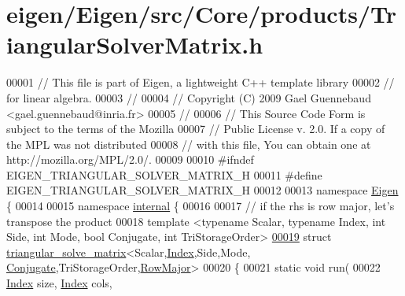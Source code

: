 \hypertarget{eigen_2_eigen_2src_2_core_2products_2_triangular_solver_matrix_8h_source}{}\section{eigen/\+Eigen/src/\+Core/products/\+Triangular\+Solver\+Matrix.h}
\label{eigen_2_eigen_2src_2_core_2products_2_triangular_solver_matrix_8h_source}

\begin{DoxyCode}
00001 \textcolor{comment}{// This file is part of Eigen, a lightweight C++ template library}
00002 \textcolor{comment}{// for linear algebra.}
00003 \textcolor{comment}{//}
00004 \textcolor{comment}{// Copyright (C) 2009 Gael Guennebaud <gael.guennebaud@inria.fr>}
00005 \textcolor{comment}{//}
00006 \textcolor{comment}{// This Source Code Form is subject to the terms of the Mozilla}
00007 \textcolor{comment}{// Public License v. 2.0. If a copy of the MPL was not distributed}
00008 \textcolor{comment}{// with this file, You can obtain one at http://mozilla.org/MPL/2.0/.}
00009 
00010 \textcolor{preprocessor}{#ifndef EIGEN\_TRIANGULAR\_SOLVER\_MATRIX\_H}
00011 \textcolor{preprocessor}{#define EIGEN\_TRIANGULAR\_SOLVER\_MATRIX\_H}
00012 
00013 \textcolor{keyword}{namespace }\hyperlink{namespace_eigen}{Eigen} \{ 
00014 
00015 \textcolor{keyword}{namespace }\hyperlink{namespaceinternal}{internal} \{
00016 
00017 \textcolor{comment}{// if the rhs is row major, let's transpose the product}
00018 \textcolor{keyword}{template} <\textcolor{keyword}{typename} Scalar, \textcolor{keyword}{typename} Index, \textcolor{keywordtype}{int} S\textcolor{keywordtype}{id}e, \textcolor{keywordtype}{int} Mode, \textcolor{keywordtype}{bool} Conjugate, \textcolor{keywordtype}{int} TriStorageOrder>
\hyperlink{struct_eigen_1_1internal_1_1triangular__solve__matrix_3_01_scalar_00_01_index_00_01_side_00_01_m9c5e3cf61677ffd5b871aafbe3527bae}{00019} \textcolor{keyword}{struct }\hyperlink{struct_eigen_1_1internal_1_1triangular__solve__matrix}{triangular\_solve\_matrix}<Scalar,\hyperlink{namespace_eigen_a62e77e0933482dafde8fe197d9a2cfde}{Index},Side,Mode,
      \hyperlink{class_eigen_1_1_conjugate}{Conjugate},TriStorageOrder,\hyperlink{group__enums_ggaacded1a18ae58b0f554751f6cdf9eb13acfcde9cd8677c5f7caf6bd603666aae3}{RowMajor}>
00020 \{
00021   \textcolor{keyword}{static} \textcolor{keywordtype}{void} run(
00022     \hyperlink{namespace_eigen_a62e77e0933482dafde8fe197d9a2cfde}{Index} size, \hyperlink{namespace_eigen_a62e77e0933482dafde8fe197d9a2cfde}{Index} cols,

\end{DoxyCode}
